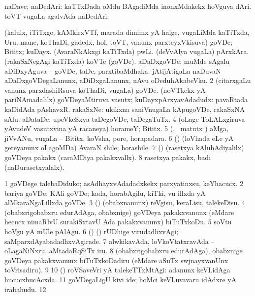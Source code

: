 {\bentry
{} 
\gl{\nA}
\bmng
 naDave; naDedAri: 
\banum
{} kaTTxDada oMdu BAgadiMda inonxMdakekx hoVguva dAri. 
 toVT \mo vugaLa agalvAda naDedAri. 
\eanum
\emng
\eentry

\bentry
{} 
\gl{\nA}
\expl{}
\bmng
\bnum
{} (kalulx, iTiTxge, kAMkirxVTf, marada dimimx yA halge, \mo vugaLiMda kaTiTxda, Uru, mane, koThaDi, gadedx, hol, toVT, \mo vanunx parxteyxVkisuva) 
\banum
{} goVDe; Bititx; kuDayx. 
 (AvaraNkAkxgi kaTiTxda) pwLi. 
 (deVvAlya \mo vugaLa) pArxkAra. 
 (rakaSxNegAgi kaTiTxda) koVTe (goVDe). 
 aDaDxgoVDe; muMde sAgalu aDiDxyAguva -- goVDe, taDe, parxtibaMdhaka:  jAtijAtigaLa naDuvaN aDaDxgoVDegaLanunx, aDiDxgaLanunx, nAvu oDeduhAkabeVku. 
\eanum
\numie
\num{2} (citarxgaLu \mo vanunx parxdashiRsuva koThaDi, \mo vugaLa) goVDe. 
 (noVTkekx yA pariNAmadalilx) goVDeyaMtiruva vasutx; kuDayxpArxyavAdadudx: 
\banum
{} pavaRtada kaDidAda pAshavxR. 
 rakaSxNe:  ukikxna saniVnugaLa kApugoVDe, rakaSxNA sAlu. 
 aDataDe:  upeVkeSxya taDegoVDe, taDegaTuTx. 
\eanum
\numie
\num{4} (oLage ToLALxgiruva yAvudeV vasutxvina yA racaneya) horameY; Bititx. 
\num{5} (\aMrashA, \pArxvi\ matutx \savi) aMga, jiVvANu, \mo vugaLa -- Bititx, koVsha, pore, horapadara. 
\num{6} (\Kani) (loVhada eLe yA gereyanunx oLagoMDa) AvaraN shile; horashile. 
\num{7} (\pArxparx) (rasetxya kAluhAdiyalilx) goVDeya pakakx (caraMDiya pakakxvallx). 
\num{8} rasetxya pakakx, badi (naDurasetxyalalx). 
\enum
\emng

\noindent 
\gl{\pagu}
\expl{}
\bmng
\bnum
\num{1}  goVDege talebaDiduko; asAdhayxvAdadadxkekx parxyatinxsu, keYhacucx. 
\num{2}  bariya goVDe; KAli goVDe; kada, horabAgilu, kiTki, \mo vu illxda yA alMkaraNgaLillxda goVDe. 
\num{3}  (\AmA) (obabxnanunx) reVgisu, keraLisu, talekeDisu. 
\num{4}  (obabxrigobabxru edurAdAga, obabxnige) goVDeya pakakxvanunx (eMdare hecucx nimaRlvU surakiSxtavU Ada pakakxvanunx) biTuTxkoDu. 
\num{5}  soVtu hoVgu yA mUle pAlAgu. 
\num{6}  (\ame) (\ashi) rUDhige virudadhxvAgi; saMparxdAyabadadhxvAgirade. 
\num{7}  alwkikavAda, loVkoVtatxravAda -- oLagaNiNxru, aMtadaRqSiTx iru. 
\num{8}  (obabxrigobabxru edurAdAga), obabxnige goVDeya pakakxvanunx biTuTxkoDadiru (eMdare aSuTx swjnayxvanUnx toVrisadiru). 
\num{9}  
\num{10}  (\AmA) roVSaveVri yA talekeTTxMtAgi:  adanunx keVLidAga hucucxhucAcxda. 
\num{11}  goVDegaLigU kivi ide; hoMci keVLuvavaru idAdxre yA irabahudu. 
\num{12}  
\enum
\emng
\eentry

}
